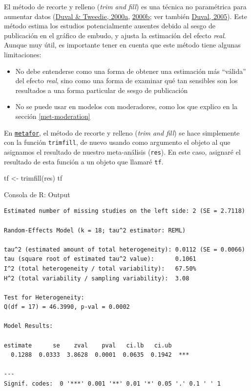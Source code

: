 \documentclass[
  bookmarksnumbered]{article}
\newenvironment{Shaded}{\begin{snugshade}}{\end{snugshade}}
\newcommand{\FunctionTok}[1]{\textcolor[rgb]{0.39,0.29,0.61}{#1}}
\newcommand{\NormalTok}[1]{\textcolor[rgb]{0.12,0.11,0.11}{#1}}
\newcommand{\OtherTok}[1]{\textcolor[rgb]{0.00,0.43,0.16}{#1}}
\begin{document}
El método de recorte y relleno (\emph{trim and fill}) es una técnica no paramétrica para aumentar datos (\protect\hyperlink{ref-duvalNonparametricTrimFill2000}{Duval \& Tweedie, 2000a}, \protect\hyperlink{ref-duvalTrimFillSimple2000}{2000b}; ver también \protect\hyperlink{ref-duvalTrimFillMethod2005}{Duval, 2005}). Este método estima los estudios potencialmente ausentes debido al sesgo de publicación en el gráfico de embudo, y ajusta la estimación del efecto \emph{real}. Aunque muy útil, es importante tener en cuenta que este método tiene algunas limitaciones:

\begin{itemize}
\item
  No debe entenderse como una forma de obtener una estimación más ``válida'' del efecto \emph{real}, sino como una forma de examinar qué tan sensibles son los resultados a una forma particular de sesgo de publicación
\item
  No se puede usar en modelos con moderadores, como los que explico en la sección \ref{met-moderation}
\end{itemize}

En \href{https://www.metafor-project.org/doku.php}{\texttt{metafor}}, el método de recorte y relleno (\emph{trim and fill}) se hace simplemente con la función \texttt{trimfill}, de nuevo usando como argumento el objeto al que asignamos el resultado de nuestro meta-análisis (\texttt{res}). En este caso, asignaré el resultado de esta función a un objeto que llamaré \texttt{tf}.

\begin{Shaded}
\begin{Highlighting}[]
\NormalTok{tf }\OtherTok{\textless{}{-}} \FunctionTok{trimfill}\NormalTok{(res)}
\NormalTok{tf}
\end{Highlighting}
\end{Shaded}

\begin{ROut}{Consola de R: Output~\thetcbcounter}
                \begin{footnotesize}
                \begin{verbatim} 
Estimated number of missing studies on the left side: 2 (SE = 2.7118)

Random-Effects Model (k = 18; tau^2 estimator: REML)

tau^2 (estimated amount of total heterogeneity): 0.0112 (SE = 0.0066)
tau (square root of estimated tau^2 value):      0.1061
I^2 (total heterogeneity / total variability):   67.50%
H^2 (total variability / sampling variability):  3.08

Test for Heterogeneity:
Q(df = 17) = 46.3990, p-val = 0.0002

Model Results:

estimate      se    zval    pval   ci.lb   ci.ub      
  0.1288  0.0333  3.8628  0.0001  0.0635  0.1942  *** 

---
Signif. codes:  0 '***' 0.001 '**' 0.01 '*' 0.05 '.' 0.1 ' ' 1
 \end{verbatim}
                \end{footnotesize}
                \end{ROut}
\end{document}
